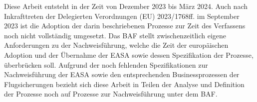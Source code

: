 
Diese Arbeit entsteht in der Zeit von Dezember 2023 bis März 2024.
Auch nach Inkrafttreten der Delegierten Verordnungen (\ac{EU}) 2023/1768ff. im September 2023 ist die Adoption der darin beschriebenen Prozesse zur Zeit des Verfassens noch nicht vollständig umgesetzt. 
Das \ac{BAF} stellt zwischenzeitlich eigene Anforderungen zu der Nachweisführung, welche die Zeit der europäischen Adoption und der Übernahme der \ac{EASA} sowie dessen Spezifikation der Prozesse, überbrücken soll.
Aufgrund der noch fehlenden Spezifikationen zur Nachweisführung der \ac{EASA} sowie den entsprechenden Businessprozessen der Flugsicherungen bezieht sich diese Arbeit in Teilen der Analyse und Definition der Prozesse noch auf Prozesse zur Nachweisführung unter dem \ac{BAF}. 



